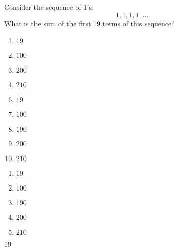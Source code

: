 


 Consider the sequence of $1$'s:
\[1,1,1,1,\ldots\]
What is the sum of the first 19 terms of this sequence?


\ifsat
	\begin{enumerate}[label=\Alph*)]
		\item   $19$%
		\item $100$
		\item  $200$
		\item   $210$
	\end{enumerate}
\else
\fi

\ifacteven
	\begin{enumerate}[label=\textbf{\Alph*.},itemsep=\fill,align=left]
		\setcounter{enumii}{5}
		\item   $19$%
		\item $100$
		\item   $190$
		\addtocounter{enumii}{1}
		\item  $200$
		\item   $210$
	\end{enumerate}
\else
\fi

\ifactodd
	\begin{enumerate}[label=\textbf{\Alph*.},itemsep=\fill,align=left]
		\item   $19$%
		\item $100$
		\item   $190$
		\item  $200$
		\item   $210$
	\end{enumerate}
\else
\fi

\ifgridin
   $19$%
		
\else
\fi

